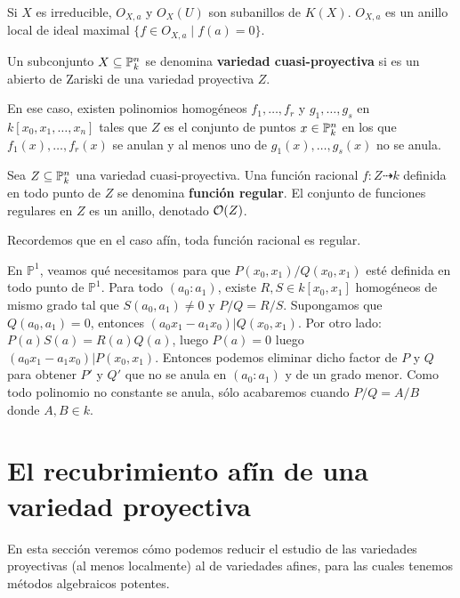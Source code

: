 \documentclass[ACGA.tex]{subfiles}
\begin{document}
\begin{prop}
Si $X$ es irreducible, $O_{X,a}$ y $O_X(U)$ son subanillos de $K(X)$. $O_{X,a}$ es un anillo local de ideal maximal $\{f \in O_{X,a} \mid f(a)=0\}$.
\end{prop}

\begin{defi}
 Un subconjunto $X\subseteq\mathbb{P}^n_k$ se denomina {\bf variedad cuasi-proyectiva} si es un abierto de Zariski de una variedad proyectiva $Z$.
\end{defi}

En ese caso, existen polinomios homogéneos $f_1,\ldots,f_r$ y $g_1,\ldots,g_s$ en $k[x_0,x_1,\ldots,x_n]$ tales que $Z$ es el conjunto de puntos $x\in\mathbb{P}^n_k$ en los que $f_1(x),\ldots,f_r(x)$ se anulan y al menos uno de $g_1(x),\ldots,g_s(x)$ no se anula. 

\begin{defi}
 Sea $Z\subseteq\mathbb{P}^n_k$ una variedad cuasi-proyectiva. Una función racional $f:Z\dashrightarrow k$ definida en todo punto de $Z$ se denomina {\bf función regular}. El conjunto de funciones regulares en $Z$ es un anillo, denotado ${\mathcal O}(Z)$.
\end{defi}

\begin{nota}
Recordemos que en el caso afín, toda función racional es regular.
\end{nota}

\begin{ej}
En $\mathbb{P}^1$, veamos qué necesitamos para que $P(x_0,x_1)/Q(x_0,x_1)$ esté definida en todo punto de $\mathbb{P}^1$. Para todo $(a_0:a_1)$, existe $R,S \in k[x_0,x_1]$ homogéneos de mismo grado tal que $S(a_0,a_1)\neq 0$ y $P/Q=R/S$. Supongamos que $Q(a_0,a_1)=0$, entonces $(a_0x_1-a_1x_0) | Q(x_0,x_1)$. Por otro lado: $P(a)S(a)=R(a)Q(a)$, luego $P(a)=0$ luego $(a_0x_1-a_1x_0) | P(x_0,x_1)$. Entonces podemos eliminar dicho factor de $P$ y $Q$ para obtener $P'$ y $Q'$ que no se anula en $(a_0:a_1)$ y de un grado menor. Como todo polinomio no constante se anula, sólo acabaremos cuando $P/Q=A/B$ donde $A,B \in k$. 
\end{ej}

\section{El recubrimiento afín de una variedad proyectiva}\label{recubrimientoafin}

En esta sección veremos cómo podemos reducir el estudio de las variedades proyectivas (al menos localmente) al de variedades afines, para las cuales tenemos métodos algebraicos potentes.
\end{document}
